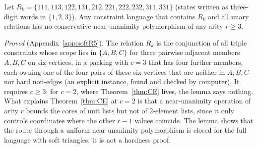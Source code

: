 \begin{lemma}\label{lem:R5}
Let $R_k=\{111,113,122,131,212,221,222,232,311,331\}$ (states written as three-digit words in $\{1,2,3\}$). Any constraint language that contains $R_k$ and all unary relations has no conservative near-unanimity polymorphism of any arity $r\ge3$.
\end{lemma}
\emph{Proved} (Appendix~\ref{app:softR5}). The relation $R_k$ is the conjunction of all triple constraints whose scope lies in $\{A,B,C\}$ for three pairwise adjacent members $A,B,C$ on six vertices, in a packing with $c=3$ that has four further members, each owning one of the four pairs of these six vertices that are neither in $A,B,C$ nor hard non-edges (an explicit instance, found and checked by computer). It requires $c\ge3$; for $c=2$, where Theorem~\ref{thm:CE} lives, the lemma says nothing. What explains Theorem~\ref{thm:CE} at $c=2$ is that a near-unanimity operation of arity $r$ bounds the cores of unit lists but not of $2$-element lists, since it only controls coordinates where the other $r-1$ values coincide. The lemma shows that the route through a uniform near-unanimity polymorphism is closed for the full language with soft triangles; it is not a hardness proof.
